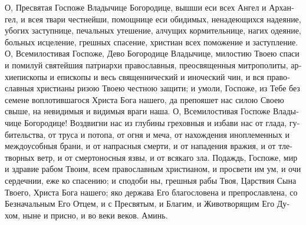 \pagebreak

\begin{russian}

  \begin{center}
    {\color{Maroon}{\large Молитва}}
  \end{center}

  \Ierei О, Пресвятая Госпоже Владычице Богородице, вышши еси всех Ангел и Архангел, и всея твари честнейши, помощнице еси обидимых, ненадеющихся надеяние, убогих заступнице, печальных утешение, алчущих кормительнице, нагих одеяние, больных исцеление, грешных спасение, христиан всех поможение и заступление. О, Всемилостивая Госпоже, Дево Богородице Владычице, милостию Твоею спаси и помилуй святейшия патриархи православныя, преосвященныя митрополиты, архиепископы и епископы и весь священнический и иноческий чин, и вся православныя христианы ризою Твоею честною защити; и умоли, Госпоже, из Тебе без семене воплотившагося Христа Бога нашего, да препояшет нас силою Своею свыше, на невидимыя и видимыя враги наша. О, Всемилостивая Госпоже Владычице Богородице! Воздвигни нас из глубины греховныя и избави нас от глада, губительства, от труса и потопа, от огня и меча, от нахождения иноплеменных и междоусобныя брани, и от напрасныя смерти, и от нападения вражия, и от тлетворных ветр, и от смертоносныя язвы, и от всякаго зла. Подаждь, Госпоже, мир и здравие рабом Твоим, всем православным христианом, и просвети им ум, и очи сердечнии, еже ко спасению; и сподоби ны, грешныя рабы Твоя, Царствия Сына Твоего, Христа Бога нашего; яко держава Его благословена и препрославлена, со Безначальным Его Отцем, и с Пресвятым, и Благим, и Животворящим Его Духом, ныне и присно, и во веки веков. Аминь.

\end{russian}

